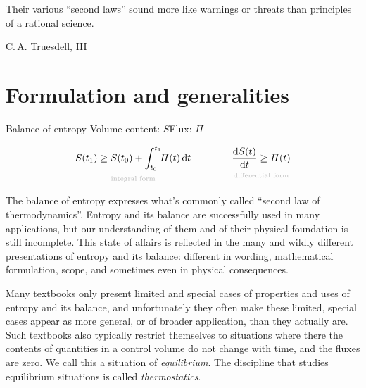 \documentclass[a4paper,12pt,%
onecolumn,oneside,%
british%
]{memoir}
\newcommand{\mynotew}[1]{{\footnotesize\color{midgrey}\faIcon{tools}\ #1}}
\newcommand*{\di}{\mathrm{d}}%
\renewcommand*{\|}[1][]{\nonscript\:#1\vert\nonscript\:\mathopen{}}
\newcommand*{\yti}{t_{0}}
\newcommand*{\ytf}{t_{1}}
\newcommand*{\yS}{S}
\newcommand*{\yB}{\varPi}
\begin{document}

\epigraph{Their various ``second laws'' sound more like warnings or threats than principles of a rational science.}{C.\,A. Truesdell, III \cites*{truesdell1969_r1984}}

\section{Formulation and generalities}
\label{sec:bal_entropy_formulation}


\begin{definition}{Balance of entropy}
  Volume content: $\yS$\qquad Flux: $\yB$


  \begin{equation}
    \label{eq:bal_entropy}
      \underbracket[0pt]{\yS(\ytf) \ge \yS(\yti) + \int_{\yti}^{\ytf}\!\!\yB(t)\,\di t}_{\mathclap{\text{\color{grey}integral form}}}
      \qquad%
      \qquad
      \underbracket[0pt]{\frac{\di\yS(t)}{\di t} \ge \yB(t)}_{\mathclap{\text{\color{grey}differential form}}}
  \end{equation}
\end{definition}


The balance of entropy expresses what's commonly called \enquote{second law of thermodynamics}. Entropy and its balance are successfully used in many applications, but our understanding of them and of their physical foundation is still incomplete. This state of affairs is reflected in the many and wildly different presentations of entropy and its balance: different in wording, mathematical formulation, scope, and sometimes even in physical consequences.

Many textbooks only present limited and special cases of properties and uses of entropy and its balance, and unfortunately they often make these limited, special cases appear as more general, or of broader application, than they actually are. Such textbooks also typically restrict themselves to situations where there the contents of quantities in a control volume do not change with time, and the fluxes are zero. We call this a situation of \emph{equilibrium}. The discipline that studies equilibrium situations is called \emph{thermostatics}.
\end{document}
